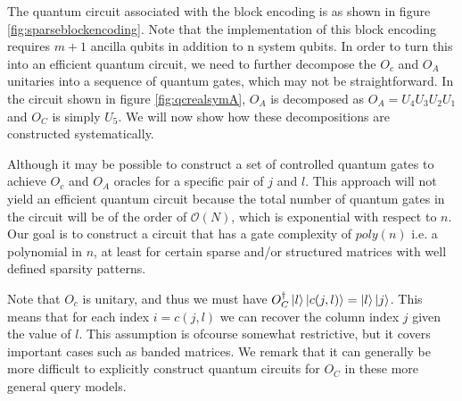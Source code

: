 \documentclass[12pt, oneside]{book}
\theoremstyle{definition}
\theoremstyle{definition}
\theoremstyle{remark}
\begin{document}
The quantum circuit associated with the block encoding is as shown in figure \ref{fig:sparseblockencoding}. Note that the implementation of this block encoding requires $m+1$ ancilla qubits in addition to n system qubits. In order to turn this into an efficient quantum circuit, we need to further decompose the $O_c$ and $O_A$ unitaries into a sequence of quantum gates, which may not be straightforward. In the circuit shown in figure \ref{fig:qcrealsymA}, $O_A$ is decomposed as $O_A=U_4U_3U_2U_1$ and $O_C$ is simply $U_5$. We will now show how these decompositions are constructed systematically.

Although it may be possible to construct a set of controlled quantum gates to achieve $O_c$ and $O_A$ oracles for a specific pair of $j$ and $l$. This approach will not yield an efficient quantum circuit because the total number of quantum gates in the circuit will be of the order of $\mathcal{O}(N)$, which is exponential with respect to $n$. Our goal is to construct a circuit that has a gate complexity of $poly(n)$ i.e. a polynomial in $n$, at least for certain sparse and/or structured matrices with well defined sparsity patterns.

Note that $O_c$ is unitary, and thus we must have $O_C^{\dagger}\ket{l}\ket{c(j,l)}=\ket{l}\ket{j}$. This means that for each index $i=c(j,l)$ we can recover the column index $j$ given the value of $l$. This assumption is ofcourse somewhat restrictive, but it covers important cases such as banded matrices. We remark that it can generally be more difficult to explicitly construct quantum circuits for $O_C$ in these more general query models.
\end{document}
